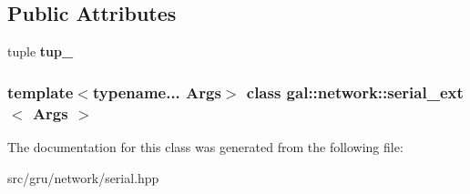 \subsection*{\-Public \-Attributes}
\begin{DoxyCompactItemize}
\item 
\hypertarget{classgal_1_1network_1_1serial__ext_ac091f912da995c0f8dad27fc225f2fba}{tuple {\bfseries tup\-\_\-}}\label{classgal_1_1network_1_1serial__ext_ac091f912da995c0f8dad27fc225f2fba}

\end{DoxyCompactItemize}
\subsubsection*{template$<$typename... \-Args$>$ class gal\-::network\-::serial\-\_\-ext$<$ Args $>$}



\-The documentation for this class was generated from the following file\-:\begin{DoxyCompactItemize}
\item 
src/gru/network/serial.\-hpp\end{DoxyCompactItemize}

